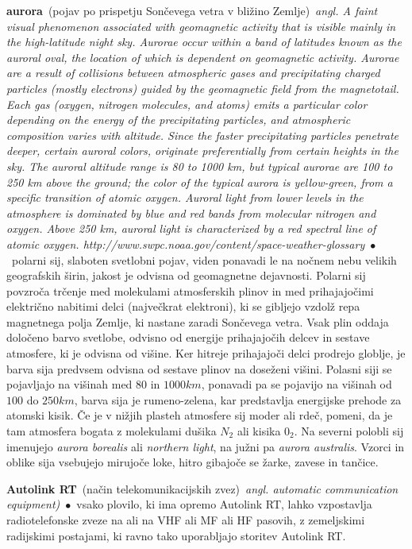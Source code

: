 \documentclass[10pt,a4paper,twoside]{article} %
\newcommand{\entry}[4]{\markboth{#1}{#1}\textbf{#1}\ {(#2)}\ \textit{#3}\ $\bullet$\ {#4}}  %
\begin{document}
\begin{multicols}{2}
	\entry{aurora}{pojav po prispetju Sončevega vetra v bližino Zemlje}{angl. A faint visual phenomenon associated with geomagnetic activity that is visible mainly in the high-latitude night sky. Aurorae occur within a band of latitudes known as the auroral oval, the location of which is dependent on geomagnetic activity. Aurorae are a result of collisions between atmospheric gases and precipitating charged particles (mostly electrons) guided by the geomagnetic field from the magnetotail. Each gas (oxygen, nitrogen molecules, and atoms) emits a particular color depending on the energy of the precipitating particles, and atmospheric composition varies with altitude. Since the faster precipitating particles penetrate deeper, certain auroral colors, originate preferentially from certain heights in the sky. The auroral altitude range is 80 to 1000 km, but typical aurorae are 100 to 250 km above the ground; the color of the typical aurora is yellow-green, from a specific transition of atomic oxygen. Auroral light from lower levels in the atmosphere is dominated by blue and red bands from molecular nitrogen and oxygen. Above 250 km, auroral light is characterized by a red spectral line of atomic oxygen. {\scriptsize http://www.swpc.noaa.gov/content/space-weather-glossary}}{polarni sij, slaboten svetlobni pojav, viden ponavadi le na nočnem nebu velikih geografskih širin, jakost je odvisna od geomagnetne dejavnosti. Polarni sij povzroča trčenje med molekulami atmosferskih plinov in med prihajajočimi električno nabitimi delci (največkrat elektroni), ki se gibljejo vzdolž repa magnetnega polja Zemlje, ki nastane zaradi Sončevega vetra. Vsak plin oddaja določeno barvo svetlobe, odvisno od energije prihajajočih delcev in sestave atmosfere, ki je odvisna od višine. Ker hitreje prihajajoči delci prodrejo globlje, je barva sija predvsem odvisna od sestave plinov na doseženi višini. Polasni siji se pojavljajo na višinah med $ 80 $ in $ 1000 km $, ponavadi pa se pojavijo na višinah od $ 100 $ do $ 250 km $, barva sija je rumeno-zelena, kar predstavlja energijske prehode za atomski kisik. Če je v nižjih plasteh atmosfere sij moder ali rdeč, pomeni, da je tam atmosfera bogata z molekulami dušika $ N_2 $ ali kisika $ 0_2 $. Na severni polobli sij imenujejo \textit{aurora borealis} ali \textit{northern light}, na južni pa \textit{aurora australis}. Vzorci in oblike sija vsebujejo mirujoče loke, hitro gibajoče se žarke, zavese in tančice.}
	
	\entry{Autolink RT}{način telekomunikacijskih zvez}{angl. automatic communication equipment)}{vsako plovilo, ki ima opremo Autolink RT, lahko vzpostavlja radiotelefonske zveze na ali na VHF ali MF ali HF pasovih, z zemeljskimi radijskimi postajami, ki ravno tako uporabljajo storitev Autolink RT.}
	

\end{multicols}
\end{document}
